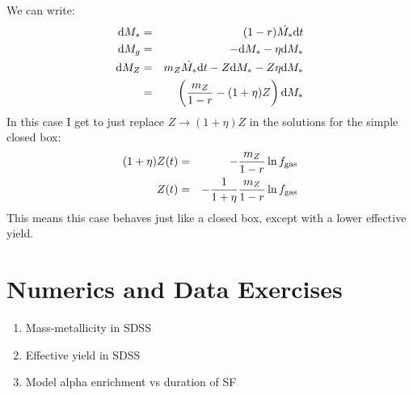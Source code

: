 \begin{enumerate}
\begin{answer}
We can write:
\begin{eqnarray}
{\rm d}M_\ast &=& (1-r) \dot{M_\ast} {\rm d}t \cr
{\rm d}M_g &=& - {\rm d}M_\ast - \eta {\rm d}M_\ast \cr
{\rm d}M_Z &=& m_Z \dot{M_\ast} {\rm d}t - Z {\rm d}M_\ast - Z \eta
{\rm d}M_\ast
\cr
&=& \left(\frac{m_Z}{1-r} - (1+\eta) Z\right) {\rm d}M_\ast
\end{eqnarray}
In this case I get to just replace $Z \rightarrow (1+\eta) Z$ in the
solutions for the simple closed box:
\begin{eqnarray}
(1+\eta) Z(t) &=& - \frac{m_Z}{1-r} \ln f_{\rm gas} \cr
Z(t) &=& - \frac{1}{1+\eta} \frac{m_Z}{1-r} \ln f_{\rm gas}
\end{eqnarray}
This means this case behaves just like a closed box, except with a
lower effective yield. 
\end{answer}

\end{enumerate}

\section{Numerics and Data Exercises}

\begin{enumerate}
\item Mass-metallicity in SDSS
\item Effective yield in SDSS
\item Model alpha enrichment vs duration of SF
\end{enumerate}

